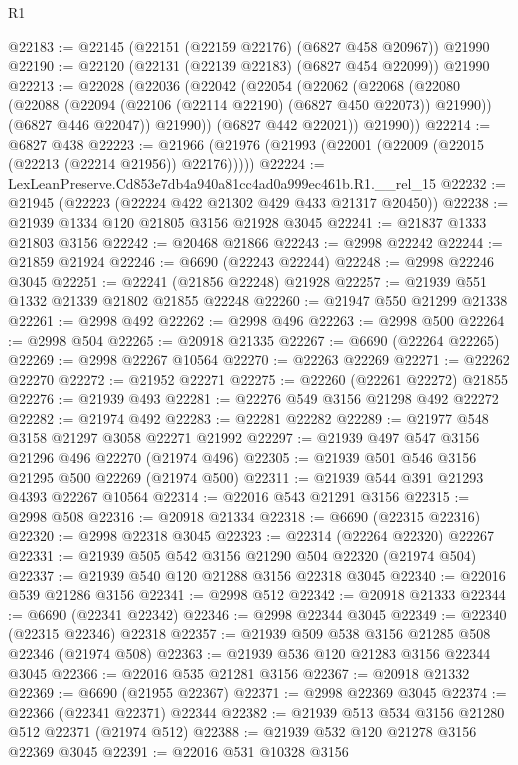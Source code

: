 \begin{lexlean}{R1}
\begin{coremodule}
@22183 := @22145 (@22151 (@22159 @22176) (@6827 @458 @20967)) @21990
@22190 := @22120 (@22131 (@22139 @22183) (@6827 @454 @22099)) @21990
@22213 := @22028
    (@22036
      (@22042
        (@22054
          (@22062
            (@22068
              (@22080
                (@22088 (@22094 (@22106 (@22114 @22190) (@6827 @450 @22073)) @21990))
                (@6827 @446 @22047))
              @21990))
          (@6827 @442 @22021))
        @21990))
@22214 := @6827 @438
@22223 := @21966 (@21976 (@21993 (@22001 (@22009 (@22015 (@22213 (@22214 @21956)) @22176)))))
@22224 := LexLeanPreserve.Cd853e7db4a940a81cc4ad0a999ec461b.R1.__rel_15
@22232 := @21945 (@22223 (@22224 @422 @21302 @429 @433 @21317 @20450))
@22238 := @21939 @1334 @120 @21805 @3156 @21928 @3045
@22241 := @21837 @1333 @21803 @3156
@22242 := @20468 @21866
@22243 := @2998 @22242
@22244 := @21859 @21924
@22246 := @6690 (@22243 @22244)
@22248 := @2998 @22246 @3045
@22251 := @22241 (@21856 @22248) @21928
@22257 := @21939 @551 @1332 @21339 @21802 @21855 @22248
@22260 := @21947 @550 @21299 @21338
@22261 := @2998 @492
@22262 := @2998 @496
@22263 := @2998 @500
@22264 := @2998 @504
@22265 := @20918 @21335
@22267 := @6690 (@22264 @22265)
@22269 := @2998 @22267 @10564
@22270 := @22263 @22269
@22271 := @22262 @22270
@22272 := @21952 @22271
@22275 := @22260 (@22261 @22272) @21855
@22276 := @21939 @493
@22281 := @22276 @549 @3156 @21298 @492 @22272
@22282 := @21974 @492
@22283 := @22281 @22282
@22289 := @21977 @548 @3158 @21297 @3058 @22271 @21992
@22297 := @21939 @497 @547 @3156 @21296 @496 @22270 (@21974 @496)
@22305 := @21939 @501 @546 @3156 @21295 @500 @22269 (@21974 @500)
@22311 := @21939 @544 @391 @21293 @4393 @22267 @10564
@22314 := @22016 @543 @21291 @3156
@22315 := @2998 @508
@22316 := @20918 @21334
@22318 := @6690 (@22315 @22316)
@22320 := @2998 @22318 @3045
@22323 := @22314 (@22264 @22320) @22267
@22331 := @21939 @505 @542 @3156 @21290 @504 @22320 (@21974 @504)
@22337 := @21939 @540 @120 @21288 @3156 @22318 @3045
@22340 := @22016 @539 @21286 @3156
@22341 := @2998 @512
@22342 := @20918 @21333
@22344 := @6690 (@22341 @22342)
@22346 := @2998 @22344 @3045
@22349 := @22340 (@22315 @22346) @22318
@22357 := @21939 @509 @538 @3156 @21285 @508 @22346 (@21974 @508)
@22363 := @21939 @536 @120 @21283 @3156 @22344 @3045
@22366 := @22016 @535 @21281 @3156
@22367 := @20918 @21332
@22369 := @6690 (@21955 @22367)
@22371 := @2998 @22369 @3045
@22374 := @22366 (@22341 @22371) @22344
@22382 := @21939 @513 @534 @3156 @21280 @512 @22371 (@21974 @512)
@22388 := @21939 @532 @120 @21278 @3156 @22369 @3045
@22391 := @22016 @531 @10328 @3156

\end{coremodule}
\end{lexlean}
